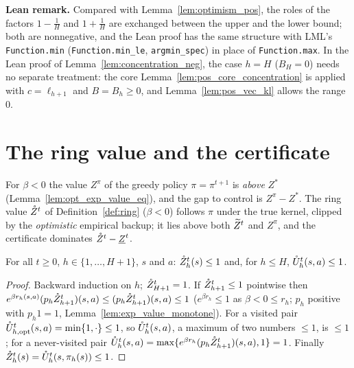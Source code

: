 \textbf{Lean remark.} Compared with Lemma~\ref{lem:optimism_pos}, the roles of the factors
$1 - \frac1H$ and $1 + \frac1H$ are exchanged between the upper and the lower bound; both are
nonnegative, and the Lean proof has the same structure with LML's \texttt{Function.min}
(\texttt{Function.min\_le}, \texttt{argmin\_spec}) in place of \texttt{Function.max}. In the Lean proof of
Lemma~\ref{lem:concentration_neg}, the case $h = H$ ($B_H = 0$) needs no separate treatment: the core
Lemma~\ref{lem:pos_core_concentration} is applied with $c = \ell_{h+1}$ and $B = B_h \ge 0$, and
Lemma~\ref{lem:pos_vec_kl} allows the range $0$.

\section{The ring value and the certificate}
\label{sec:neg_certificate}

For $\beta < 0$ the value $Z^{\pi}$ of the greedy policy $\pi = \pi^{t+1}$ is \emph{above} $Z^*$
(Lemma~\ref{lem:opt_exp_value_eq}), and the gap to control is $Z^\pi - Z^*$. The ring value $\mathring{Z}^t$ of
Definition~\ref{def:ring} ($\beta < 0$) follows $\pi$ under the true kernel, clipped by the
\emph{optimistic} empirical backup; it lies above both $\widetilde{Z}^t$ and $Z^\pi$, and the certificate
dominates $\mathring{Z}^t - \underline{Z}^t$.

\begin{lemma}\label{lem:neg_ring_range}
\leanok
{}
For all $t \ge 0$, $h \in \{1, \dots, H + 1\}$, $s$ and $a$: $\mathring{Z}_h^t(s) \le 1$ and, for $h \le H$,
$\mathring{U}_h^t(s,a) \le 1$.
\end{lemma}

\begin{proof}
\leanok
Backward induction on $h$; $\mathring{Z}_{H+1}^t = 1$. If $\mathring{Z}_{h+1}^t \le 1$ pointwise then
$e^{\beta r_h(s,a)}(p_h\mathring{Z}^t_{h+1})(s,a) \le (p_h\mathring{Z}^t_{h+1})(s,a) \le 1$ ($e^{\beta r_h} \le 1$ as $\beta < 0 \le r_h$; $p_h$
positive with $p_h1 = 1$, Lemma~\ref{lem:exp_value_monotone}). For a visited pair
$\mathring{U}^t_{h,\mathrm{opt}}(s,a) = \min\{1, \cdot\} \le 1$, so $\mathring{U}_h^t(s,a)$, a maximum of two numbers $\le 1$,
is $\le 1$; for a never-visited pair $\mathring{U}_h^t(s,a) = \max\{e^{\beta r_h}(p_h\mathring{Z}^t_{h+1})(s,a), 1\} = 1$.
Finally $\mathring{Z}_h^t(s) = \mathring{U}_h^t(s, \pi_h(s)) \le 1$.
\end{proof}

